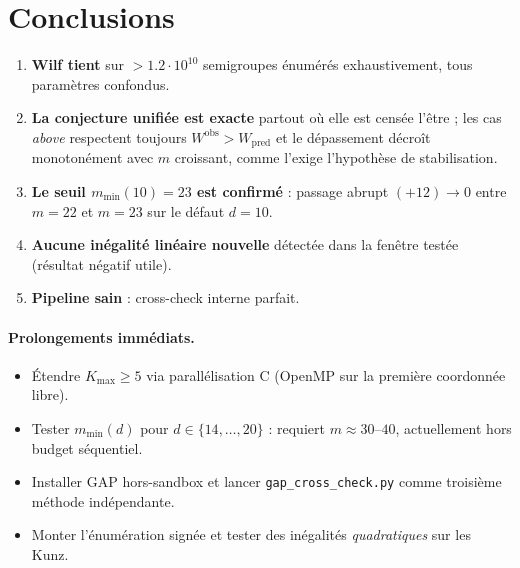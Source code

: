 \documentclass[11pt,a4paper]{article}
\begin{document}
\section{Conclusions}

\begin{enumerate}
  \item \textbf{Wilf tient} sur $>1.2\cdot 10^{10}$ semigroupes énumérés
  exhaustivement, tous paramètres confondus.
  \item \textbf{La conjecture unifiée est exacte} partout où elle est
  censée l'être ; les cas \emph{above} respectent toujours
  $W^{\text{obs}}>W_{\mathrm{pred}}$ et le dépassement décroît
  monotonément avec $m$ croissant, comme l'exige l'hypothèse de
  stabilisation.
  \item \textbf{Le seuil $m_{\min}(10)=23$ est confirmé} : passage abrupt
  $(+12)\to 0$ entre $m=22$ et $m=23$ sur le défaut $d=10$.
  \item \textbf{Aucune inégalité linéaire nouvelle} détectée dans la
  fenêtre testée (résultat négatif utile).
  \item \textbf{Pipeline sain} : cross-check interne parfait.
\end{enumerate}

\paragraph{Prolongements immédiats.}
\begin{itemize}
  \item Étendre $K_{\max}\ge 5$ via parallélisation C (OpenMP sur
  la première coordonnée libre).
  \item Tester $m_{\min}(d)$ pour $d\in\{14,\dots,20\}$ : requiert
  $m\approx 30$--$40$, actuellement hors budget séquentiel.
  \item Installer GAP hors-sandbox et lancer
  \texttt{gap\_cross\_check.py} comme troisième méthode indépendante.
  \item Monter l'énumération signée et tester des inégalités
  \emph{quadratiques} sur les Kunz.
\end{itemize}
\end{document}
